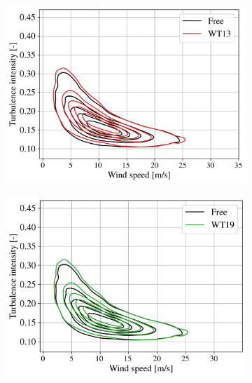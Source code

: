 \begin{figure}
    \centering
    \begin{subfigure}[b]{0.3\textwidth}
        \includegraphics[width=\textwidth]{part2/figures/WAKE/joint_perturbation_SB_WT13.png}
    \end{subfigure}
    \begin{subfigure}[b]{0.3\textwidth}
        \includegraphics[width=\textwidth]{part2/figures/WAKE/joint_perturbation_SB_WT19.png}
    \end{subfigure}
    \begin{subfigure}[b]{0.3\textwidth}

\end{subfigure}
\end{figure}
